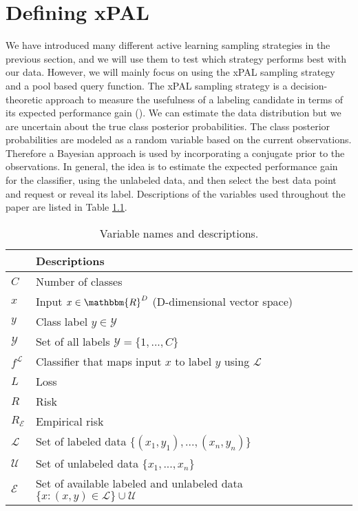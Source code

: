 \chapter{Defining xPAL}

We have introduced many different active learning sampling strategies in the previous section, and we will use them to test which strategy performs best with our data. However, we will mainly focus on using the xPAL sampling strategy and a pool based query function. The xPAL sampling strategy is a decision-theoretic approach to measure the usefulness of a labeling candidate in terms of its expected performance gain (\cite{kottke2021toward}). We can estimate the data distribution but we are uncertain about the true class posterior probabilities. The class posterior probabilities are modeled as a random variable based on the current observations. Therefore a Bayesian approach is used by incorporating a conjugate prior to the observations. In general, the idea is to estimate the expected performance gain for the classifier, using the unlabeled data, and then select the best data point and request or reveal its label. Descriptions of the variables used throughout the paper are listed in Table \ref{tab:var_defs}.

\begin{table}[ht]
\centering
\renewcommand{\arraystretch}{1.2}
\begin{tabular}{|l|l|}
\hline
{} & \textbf{Descriptions} \\
\hline
$C$                         & Number of classes \\
\hline
$x$                         & Input $x \in \mathbbm{R}^D$ (D-dimensional vector space)\\
\hline
$y$                         & Class label $y \in \mathcal{Y}$ \\
\hline
$\mathcal{Y}$               & Set of all labels $\mathcal{Y} = \{ 1,...,C \}$ \\
\hline
$f^{\mathcal{L}}$           & Classifier that maps input $x$ to label $y$ using $\mathcal{L}$ \\
\hline
$\textit{L}$                & Loss\\
\hline
$\textit{R}$                & Risk \\
\hline
$\textit{R}_{\mathcal{E}}$  & Empirical risk\\
\hline
$\mathcal{L}$               & Set of labeled data $\{(x_1,y_1),...,(x_n,y_n)\}$ \\
\hline
$\mathcal{U}$               & Set of unlabeled data $\{x_1,...,x_n\}$ \\
\hline
$\mathcal{E}$               & Set of available labeled and unlabeled data $\{x : (x,y) \in \mathcal{L}\} \cup \mathcal{U}$ \\
\hline
\end{tabular}
\caption{Variable names and descriptions.}
\label{tab:var_defs}
\end{table}

